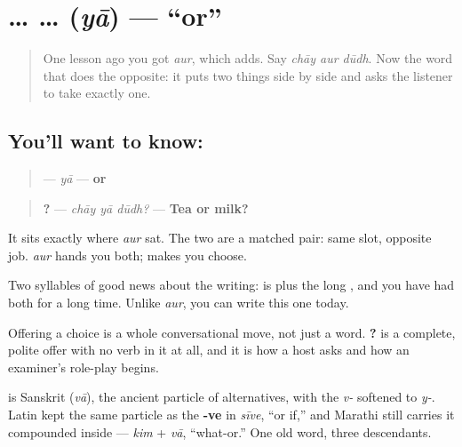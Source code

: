 \section[\texorpdfstring{… \hi{या} … (… yā …)}{… या … (… yā …)}]{…  … (\emph{yā}) — \textquotedblleft{}or\textquotedblright{}}

\label{lesson:HI-C68-ya}



\begin{quote}
One lesson ago you got \emph{aur}, which adds. Say \emph{chāy aur dūdh}. Now the word that does the opposite: it puts two things side by side and asks the listener to take exactly one.
\end{quote}

\subsection*{You'll want to know: }
\begin{quote}
\textbf{} — \emph{yā} — \textbf{or}
\end{quote}

\begin{quote}
\textbf{  ?} — \emph{chāy yā dūdh?} — \textbf{Tea or milk?}
\end{quote}

It sits exactly where \emph{aur} sat. The two are a matched pair: same slot, opposite job. \emph{aur} hands you both; \textbf{} makes you choose.

Two syllables of good news about the writing: \textbf{} is \textbf{} plus the long \textbf{}, and you have had both for a long time. Unlike \emph{aur}, you can write this one today.

Offering a choice is a whole conversational move, not just a word. \textbf{  ?} is a complete, polite offer with no verb in it at all, and it is how a host asks and how an examiner's role-play begins.

\textbf{} is Sanskrit \textbf{} (\emph{vā}), the ancient particle of alternatives, with the \emph{v-} softened to \emph{y-}. Latin kept the same particle as the \textbf{-ve} in \emph{sīve}, \textquotedblleft{}or if,\textquotedblright{} and Marathi still carries it compounded inside \textbf{} — \emph{kim} + \emph{vā}, \textquotedblleft{}what-or.\textquotedblright{} One old word, three descendants.

